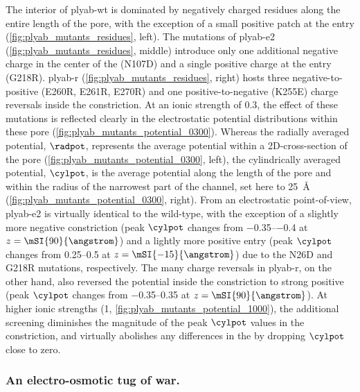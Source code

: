 The interior of \gls{plyab-wt} is dominated by negatively charged residues along the entire length of the
pore, with the exception of a small positive patch at the \transi{} entry (\cref{fig:plyab_mutants_residues},
left). The mutations of \gls{plyab-e2} (\cref{fig:plyab_mutants_residues}, middle) introduce only one
additional negative charge in the center of the \transi{} \lumen{} (N107D) and a single positive charge at the
\transi{} entry (G218R). \Gls{plyab-r} (\cref{fig:plyab_mutants_residues}, right) hosts three
negative-to-positive (E260R, E261R, E270R) and one positive-to-negative (K255E) charge reversals inside the
\cisi{} constriction. At an ionic strength of \SI{0.3}{\Molar}, the effect of these mutations is reflected
clearly in the electrostatic potential distributions within these pore
(\cref{fig:plyab_mutants_potential_0300}). Whereas the radially averaged potential, $\radpot$, represents the
average potential within a 2D-cross-section of the pore (\cref{fig:plyab_mutants_potential_0300}, left), the
cylindrically averaged potential, $\cylpot$, is the average potential along the length of the pore and within
the radius of the narrowest part of the channel, set here to \SI{25}{\angstrom}
(\cref{fig:plyab_mutants_potential_0300}, right). From an electrostatic point-of-view, \gls{plyab-e2} is
virtually identical to the wild-type, with the exception of a slightly more negative constriction (peak
$\cylpot$ changes from \SIrange{-0.35}{-0.4}{\kTe} at $z = \mSI{90}{\angstrom}$) and a lightly more positive
\transi{} entry (peak $\cylpot$ changes from \SIrange{+0.25}{+0.5}{\kTe} at $z = \mSI{-15}{\angstrom}$) due to
the N26D and G218R mutations, respectively. The many charge reversals in \gls{plyab-r}, on the other hand,
also reversed the potential inside the constriction to strong positive (peak $\cylpot$ changes from
\SIrange{-0.35}{+0.35}{\kTe} at $z = \mSI{90}{\angstrom}$). At higher ionic strengths (\SI{1}{\Molar},
\cref{fig:plyab_mutants_potential_1000}), the additional screening diminishes the magnitude of the peak
$\cylpot$ values in the constriction, and virtually abolishes any differences in the \transi{} \lumen{} by
dropping $\cylpot$ close to zero.

\subsubsection{An electro-osmotic tug of war.}
%

